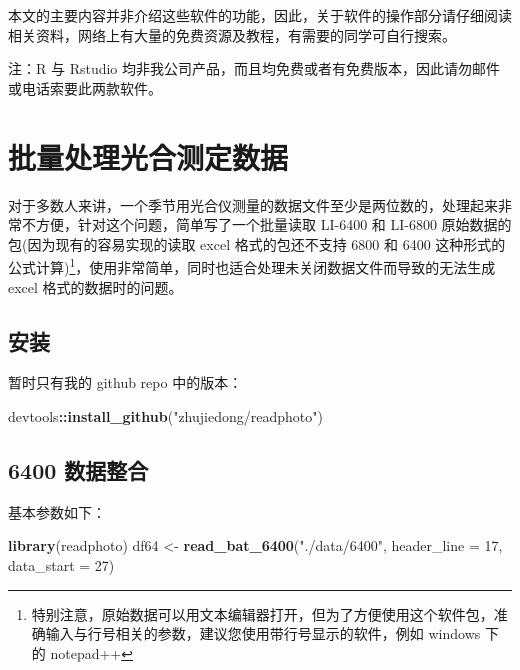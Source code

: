 \documentclass[
]{krantz}
\makeatletter
\newenvironment{Shaded}{\begin{snugshade}}{\end{snugshade}}
\newcommand{\DataTypeTok}[1]{\textcolor[rgb]{0.13,0.29,0.53}{#1}}
\newcommand{\DecValTok}[1]{\textcolor[rgb]{0.00,0.00,0.81}{#1}}
\newcommand{\KeywordTok}[1]{\textcolor[rgb]{0.13,0.29,0.53}{\textbf{#1}}}
\newcommand{\NormalTok}[1]{#1}
\newcommand{\OperatorTok}[1]{\textcolor[rgb]{0.81,0.36,0.00}{\textbf{#1}}}
\newcommand{\StringTok}[1]{\textcolor[rgb]{0.31,0.60,0.02}{#1}}
\renewenvironment{quote}{\begin{VF}}{\end{VF}}
\newenvironment{kframe}{%
\medskip{}
\setlength{\fboxsep}{.8em}
 \def\at@end@of@kframe{}%
 \ifinner\ifhmode%
  \def\at@end@of@kframe{\end{minipage}}%
  \begin{minipage}{\columnwidth}%
 \fi\fi%
 \def\FrameCommand##1{\hskip\@totalleftmargin \hskip-\fboxsep
 \colorbox{shadecolor}{##1}\hskip-\fboxsep
     \hskip-\linewidth \hskip-\@totalleftmargin \hskip\columnwidth}%
 \MakeFramed {\advance\hsize-\width
   \@totalleftmargin\z@ \linewidth\hsize
   \@setminipage}}%
 {\par\unskip\endMakeFramed%
 \at@end@of@kframe}
\renewenvironment{Shaded}{\begin{kframe}}{\end{kframe}}
\makeatother
\begin{document}
本文的主要内容并非介绍这些软件的功能，因此，关于软件的操作部分请仔细阅读相关资料，网络上有大量的免费资源及教程，有需要的同学可自行搜索。

\begin{quote}
注：R 与 Rstudio 均非我公司产品，而且均免费或者有免费版本，因此请勿邮件或电话索要此两款软件。
\end{quote}

\cleardoublepage

\hypertarget{batch_question}{%
\chapter{批量处理光合测定数据}\label{batch_question}}

对于多数人来讲，一个季节用光合仪测量的数据文件至少是两位数的，处理起来非常不方便，针对这个问题，简单写了一个批量读取 LI-6400 和 LI-6800 原始数据的包(因为现有的容易实现的读取 excel 格式的包还不支持 6800 和 6400 这种形式的公式计算)\footnote{特别注意，原始数据可以用文本编辑器打开，但为了方便使用这个软件包，准确输入与行号相关的参数，建议您使用带行号显示的软件，例如 windows 下的 notepad++}，使用非常简单，同时也适合处理未关闭数据文件而导致的无法生成 excel 格式的数据时的问题。

\hypertarget{install_readphoto}{%
\section{安装}\label{install_readphoto}}

暂时只有我的 github repo 中的版本：

\begin{Shaded}
\begin{Highlighting}[]
\NormalTok{devtools}\OperatorTok{::}\KeywordTok{install_github}\NormalTok{(}\StringTok{"zhujiedong/readphoto"}\NormalTok{)}
\end{Highlighting}
\end{Shaded}

\hypertarget{batch64}{%
\section{6400 数据整合}\label{batch64}}

基本参数如下：

\begin{Shaded}
\begin{Highlighting}[]
\KeywordTok{library}\NormalTok{(readphoto)}
\NormalTok{df64  <-}\StringTok{ }\KeywordTok{read_bat_6400}\NormalTok{(}\StringTok{"./data/6400"}\NormalTok{, }\DataTypeTok{header_line =} \DecValTok{17}\NormalTok{, }\DataTypeTok{data_start =} \DecValTok{27}\NormalTok{)}
\end{Highlighting}
\end{Shaded}
\end{document}
